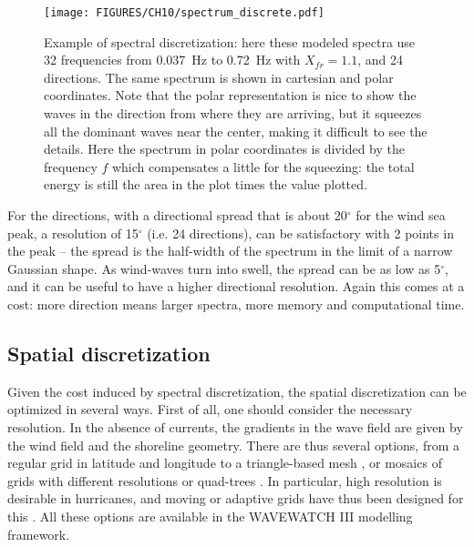 \begin{figure}[htb]
\centerline{\texttt{[image: FIGURES/CH10/spectrum\_discrete.pdf]}}
\caption{Example of spectral discretization: here these modeled spectra use 32 frequencies from 0.037~Hz to 0.72~Hz with $X_{fr}=1.1$, and 24 directions. The same spectrum 
is shown in cartesian and polar coordinates. 
Note that the polar representation is nice to show the waves in the direction from where they are arriving, but it squeezes all the dominant waves near the center, 
making it difficult to see the details. Here the spectrum in polar coordinates is divided by the frequency $f$ which compensates a little for the squeezing: the 
total energy is still the area in the plot times the value plotted.}
\label{fig:sectral_discretization}
\end{figure}
For the directions, with a directional spread that is about 20$^\circ$ for the wind sea peak, a 
resolution of 15$^\circ$ (i.e. 24 directions), can be satisfactory with 2 points in the peak  -- the spread is the half-width of the spectrum in the 
limit of a narrow Gaussian shape. 
As wind-waves turn into swell, the spread can be as low as  5$^\circ$, 
and it can be useful to have a higher directional resolution. Again this comes at a cost: 
more direction means larger spectra, more memory and computational time. 



\subsection{Spatial discretization}
Given the cost induced by spectral discretization, the spatial discretization can be optimized in several ways. 
First of all, one should consider the necessary resolution. In the absence of currents, the gradients in the wave field are given by the 
wind field and the shoreline geometry. There are thus several options, from a regular grid in latitude and longitude to a triangle-based mesh
\citep[e.g.]{Benoit&al.1996,Roland&Ardhuin2014}, or mosaics of grids with different resolutions \citep{Tolman2008} or quad-trees \citep{Popinet&al.2010,Li2010}. 
In particular, high resolution is desirable in hurricanes, and moving or adaptive grids have thus been designed for this \citep{Tolman&Alves2005,Popinet&al.2010}. 
All these options are available in the WAVEWATCH III modelling framework. 

